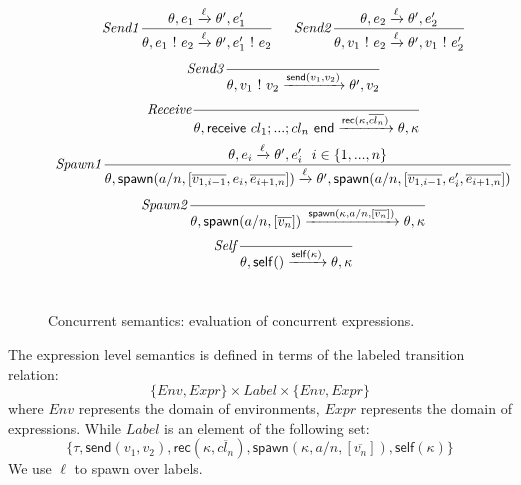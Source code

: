 \documentclass[runningheads]{llncs}
\newcommand{\ms}[1]{\mathsf{#1}}
\begin{document}
\begin{figure}[t]
\small
\centering
  $
  \begin{array}{c}
  
  \displaystyle
  	
  \mathit{Send1}
  \frac{\theta,e_1 \xrightarrow{\ell} \theta',e'_1}
  {\theta,e_1~!~e_2\xrightarrow{\ell}\theta',e'_1~!~e_2}
  
  \hskip 1.5em
  
  \mathit{Send2}
  \frac{\theta,e_2 \xrightarrow{\ell} \theta',e'_2}
  {\theta,v_1~!~e_2\xrightarrow{\ell}\theta',v_1~!~e'_2}\\[4ex]
  
  \displaystyle
  
  \mathit{Send3}
  \frac{}
  {\theta,v_1~!~v_2\xrightarrow{\ms{send}(v_1,v_2)}\theta',v_2}\\[4ex]
  
  \displaystyle
  
  \mathit{Receive}
  \frac{}
  {\theta, \ms{receive}~cl_1;...;cl_n~\ms{end}
  \xrightarrow{\ms{rec}(\kappa,\overline{cl_n})} \theta,\kappa}\\[4ex]
  
  \displaystyle

  \mathit{Spawn1}
  \frac{\theta, e_i \xrightarrow{\ell} \theta',e'_i ~~i\in\{1,...,n\}}
  {\theta,\ms{spawn}(a/n,[\overline{v_{1,i-1}}, e_i, \overline{e_{i+1,n}}])
  \xrightarrow{\ell} 
  \theta',\ms{spawn}(a/n,[\overline{v_{1,i-1}}, e'_i, \overline{e_{i+1,n}}])}\\[4ex]
  
  \displaystyle
  
  \mathit{Spawn2}
  \frac{}
  {\theta,\ms{spawn}(a/n,[\overline{v_n}]) \xrightarrow{\ms{spawn}(\kappa,a/n,[\overline{v_n}])} \theta,\kappa }\\[4ex]
  
  \displaystyle
  
  \mathit{Self}
  \frac{}
  {\theta,\ms{self}() \xrightarrow{\ms{self}(\kappa)} \theta,\kappa }\\[4ex]
  
  \displaystyle

  \end{array}
  $

\caption{Concurrent semantics: evaluation of concurrent expressions.}
\label{fig:conc-semantics}
\end{figure}

The expression level semantics is defined in terms of the labeled transition relation:
\[ \{Env,Expr\} \times Label \times \{Env, Expr\} \]
where $Env$ represents the domain of environments, $Expr$ represents the domain
of expressions. While $Label$ is an element of the following set:
\[\{\tau, \ms{send}(v_1,v_2), \ms{rec}(\kappa, \overline{cl_n}),
  \ms{spawn}(\kappa, a/n, [\overline{v_n}]), \ms{self}(\kappa)\}\]
We use $\ell$ to spawn over labels.
\end{document}
